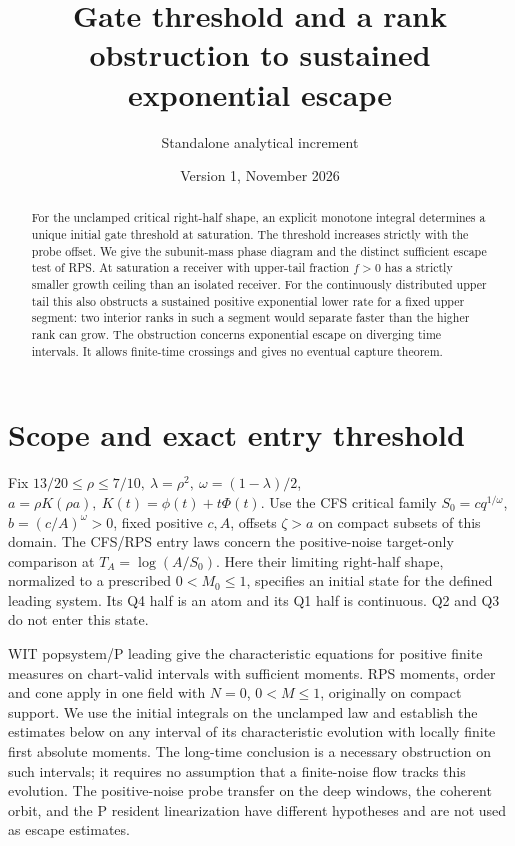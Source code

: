\documentclass[11pt]{article}
\title{Gate threshold and a rank obstruction to sustained exponential escape}
\author{Standalone analytical increment}\date{Version 1, November 2026}
\begin{document}
\maketitle
\begin{abstract}
For the unclamped critical right-half shape, an explicit monotone
integral determines a unique initial gate threshold at saturation.
The threshold increases strictly with the probe offset. We give the
subunit-mass phase diagram and the distinct sufficient escape test of RPS.
At saturation a receiver with upper-tail fraction \(f>0\) has a
strictly smaller growth ceiling than an isolated receiver. For the
continuously distributed upper tail this also obstructs a sustained
positive exponential lower rate for a fixed upper segment: two interior
ranks in such a segment would separate faster than the higher rank
can grow. The obstruction concerns exponential escape on diverging
time intervals. It allows finite-time crossings and gives no eventual
capture theorem.
\end{abstract}

\section{Scope and exact entry threshold}\label{an04goev1:scope}
Fix \(13/20\le\rho\le7/10,\ \lambda=\rho^2,\ \omega=(1-\lambda)/2\),
\(a=\rho K(\rho a),\ K(t)=\phi(t)+t\Phi(t)\). Use the CFS critical
family \(S_0=cq^{1/\omega}\), \(b=(c/A)^\omega>0\), fixed positive
\(c,A\), offsets \(\zeta>a\) on compact subsets of this domain.
The CFS/RPS entry laws concern the positive-noise target-only
comparison at \(T_A=\log(A/S_0)\). Here their limiting right-half
shape, normalized to a prescribed \(0<M_0\le1\), specifies an
initial state for the defined leading system. Its Q4 half is an atom
and its Q1 half is continuous. Q2 and Q3 do not enter this state.

WIT popsystem/P leading give the characteristic equations for positive
finite measures on chart-valid intervals with sufficient moments.
RPS moments, order and cone apply in one field with \(N=0\),
\(0<M\le1\), originally on compact support. We use the initial
integrals on the unclamped law and establish the estimates below on
any interval of its characteristic evolution with locally finite first
absolute moments. The long-time conclusion is a necessary obstruction
on such intervals; it requires no assumption that a finite-noise flow
tracks this evolution. The positive-noise probe transfer on the deep
windows, the coherent orbit, and the P resident linearization have
different hypotheses and are not used as escape estimates.
\end{document}
